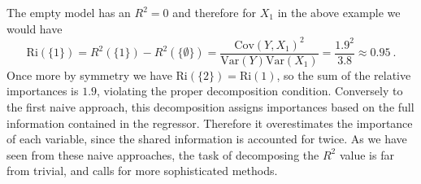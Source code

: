 The empty model has an $R^2=0$ and therefore for $X_1$ in the above example we would have
\begin{equation}
    \text{Ri}(\{1\}) = R^2(\{1\}) - R^2(\{\emptyset\}) = \frac{\text{Cov}(Y, X_1)^2}{\text{Var}(Y)\text{Var}(X_1)} = \frac{1.9^2}{3.8} \approx 0.95 \ .
\end{equation}
Once more by symmetry we have $\text{Ri}(\{2\})=\text{Ri}(1)$, so the sum of the relative importances is $1.9$, violating the proper decomposition condition.
Conversely to the first naive approach, this decomposition assigns importances based on the full information contained in the regressor. Therefore it overestimates the importance of each variable, since the shared information is accounted for twice.
\newline
\newline
As we have seen from these naive approaches, the task of decomposing the $R^2$ value is far from trivial, and calls for more sophisticated methods.

